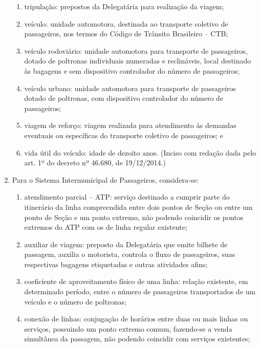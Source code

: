 \begin{enumerate}[resume,label=Art. \arabic*]
\begin{enumerate}[label=\roman*.]
\item tripulação: prepostos da Delegatária para realização da viagem;

\item veículo: unidade automotora, destinada ao transporte coletivo de passageiros, nos termos do Código de Trânsito Brasileiro – CTB;

\item veículo rodoviário: unidade automotora para transporte de passageiros, dotado de poltronas individuais numeradas e reclináveis, local destinado às bagagens e sem dispositivo controlador do número de passageiros;

\item veículo urbano: unidade automotora para transporte de passageiros dotado de poltronas, com dispositivo controlador do número de passageiros;

\item viagem de reforço: viagem realizada para atendimento às demandas eventuais ou específicas do transporte coletivo de passageiros; e

\item vida útil do veículo: idade de dezoito anos. (Inciso com redação dada pelo art. 1º do decreto nº 46.680, de 19/12/2014.)

\end{enumerate}

\item Para o Sistema Intermunicipal de Passageiros, considera-se:

\begin{enumerate}[label=\roman*.]

\item atendimento parcial – ATP: serviço destinado a cumprir parte do itinerário da linha compreendida entre dois pontos de Seção ou entre um ponto de Seção e um ponto extremo, não podendo coincidir os pontos extremos do ATP com os de linha regular existente;

\item auxiliar de viagem: preposto da Delegatária que emite bilhete de passagem, auxilia o motorista, controla o fluxo de passageiros, suas respectivas bagagens etiquetadas e outras atividades afins;

\item coeficiente de aproveitamento físico de uma linha: relação existente, em determinado período, entre o número de passageiros transportados de um veículo e o número de poltronas;

\item conexão de linhas: conjugação de horários entre duas ou mais linhas ou serviços, possuindo um ponto extremo comum, fazendo-se a venda simultânea da passagem, não podendo coincidir com serviços existentes;



\end{enumerate}
\end{enumerate}
